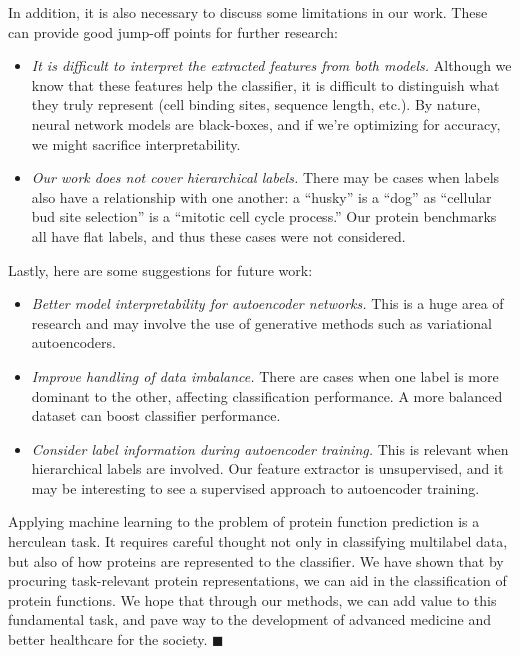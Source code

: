 \par In addition, it is also necessary to discuss some limitations in our work.
These can provide good jump-off points for further research:
\begin{itemize}
    \item \textit{It is difficult to interpret the extracted features from both
        models.} Although we know that these features help the classifier, it
        is difficult to distinguish what they truly represent (cell binding
        sites, sequence length, etc.). By nature, neural network models are
        black-boxes, and if we're optimizing for accuracy, we might sacrifice
        interpretability.
    \item \textit{Our work does not cover hierarchical labels.} There may be
        cases when labels also have a relationship with one another: a
        ``husky'' is a ``dog'' as ``cellular bud site selection'' is a
        ``mitotic cell cycle process.'' Our protein benchmarks all have flat
        labels, and thus these cases were not considered. 
\end{itemize}

\par Lastly, here are some suggestions for future work:
\begin{itemize}
    \item \textit{Better model interpretability for autoencoder networks.} This
        is a huge area of research and may involve the use of generative
        methods such as variational autoencoders.
    \item \textit{Improve handling of data imbalance.} There are cases when one
        label is more dominant to the other, affecting classification
        performance. A more balanced dataset can boost classifier performance.
    \item \textit{Consider label information during autoencoder training.} This
        is relevant when hierarchical labels are involved. Our feature
        extractor is unsupervised, and it may be interesting to see a
        supervised approach to autoencoder training.
\end{itemize}

\par Applying machine learning to the problem of protein function prediction is
a herculean task. It requires careful thought not only in classifying
multilabel data, but also of how proteins are represented to the classifier.
We have shown that by procuring task-relevant protein representations, we can
aid in the classification of protein functions. We hope that through our methods,
we can add value to this fundamental task, and pave way to the development of
advanced medicine and better healthcare for the society. $\blacksquare$

